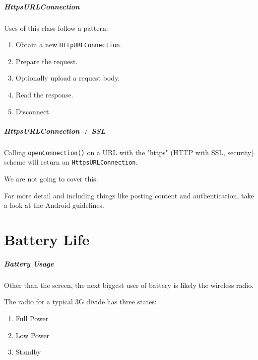 \begin{frame}
\frametitle{HttpsURLConnection}

\begin{changemargin}{1cm}

Uses of this class follow a pattern:
\begin{enumerate}
\item Obtain a new \texttt{HttpURLConnection}.
\item Prepare the request. 
\item Optionally upload a request body.
\item Read the response.
\item Disconnect.
\end{enumerate}


\end{changemargin}
\end{frame}

\begin{frame}
\frametitle{HttpsURLConnection + SSL}

\begin{changemargin}{1cm}

Calling \texttt{openConnection()} on a URL with the "https" (HTTP with SSL, security) scheme will return an \texttt{HttpsURLConnection}. 

We are not going to cover this. 

For more detail and including things like posting content and authentication, take a look at the Android guidelines.

\end{changemargin}
\end{frame}

\part{Battery Life}
\frame{\partpage}

\begin{frame}
\frametitle{Battery Usage}

\begin{changemargin}{1cm}

Other than the screen, the next biggest user of battery is likely the wireless radio. 

The radio for a typical 3G divide has three states:

\begin{enumerate}
	\item Full Power
	\item Low Power
	\item Standby
\end{enumerate}


\end{changemargin}
\end{frame}

